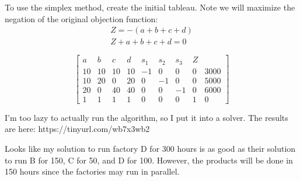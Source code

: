 \documentclass{article}
\begin{document}
To use the simplex method, create the initial tableau.
Note we will maximize the negation of the original objection function:
\begin{equation*}
\begin{aligned}
Z = -(a + b + c + d)\\
Z + a + b + c + d = 0
\end{aligned}
\end{equation*}

\[
	\begin{bmatrix}
	a & b & c & d & s_1 & s_2 & s_3 & Z\\
	10 & 10 & 10 & 10 & -1 &  0 & 0  & 0 & 3000\\
	10 & 20 & 0  & 20 &  0 & -1 & 0  & 0 & 5000\\
	20 &  0 & 40 & 40 &  0 &  0 & -1 & 0 & 6000\\
	1  &  1 &  1 &  1 &  0 &  0 & 0  & 1 & 0
	\end{bmatrix}
\]


I'm too lazy to actually run the algorithm, so I put it into a solver.  The results are here:  https://tinyurl.com/wb7x3wb2

Looks like my solution to run factory D for 300 hours is as good as their solution to run B for 150, C for 50, and D for 100.  However, the products will be done in 150 hours since the factories may run in parallel.
\end{document}
